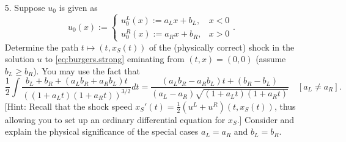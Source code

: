 \documentclass{article}
\begin{document}
\begin{itemize}
\textbf{Solution}

Let $u$ denote the solution to \eqref{eq:burgers.strong} with initial condition $u_0$, and let $v$ denote the solution to \eqref{eq:burgers.strong} with initial condition $v_0(x) := a u_0(x) + b$. Using \eqref{eq:burgers.implicit}, we wish to solve
\begin{equation*}
v = v_0 \left( x - tv \right) = a u_0 \left( x - tv \right) \quad \Leftrightarrow \quad \frac{1}{a} \left( v - b \right) = u_0 \left( (x - tb) - (at) \frac{1}{a} \left( v - b \right) \right),
\end{equation*}
which suggests that
\begin{equation*}
\frac{1}{a} \left( v(t,x) - b \right) = u \left( at, x - tb \right) \quad \Leftrightarrow \quad v(t,x) = a u \left( at, x - tb \right) + b.
\end{equation*}
Indeed, one can quickly verify that this does, in fact, solve \eqref{eq:burgers.strong} with initial condition $v_0$. In other words,
\begin{equation*}
F \left[ x \mapsto a u_0(x) + b \right](t,x) = a F \left[ u_0 \right] \left( at, x - tb \right) + b.
\end{equation*}

\item[5.] Suppose $u_0$ is given as
\begin{equation*}
u_0(x) := \begin{cases} u^L_0(x) := a_L x + b_L, & x < 0 \\ u^R_0(x) := a_R x + b_R, & x > 0 \end{cases}.
\end{equation*}
Determine the path $t \mapsto \left( t, x_S(t) \right)$ of the (physically correct) shock in the solution $u$ to \eqref{eq:burgers.strong} eminating from $(t,x) = (0,0)$ (assume $b_L \geq b_R$). You may use the fact that
\begin{equation*}
\frac{1}{2} \int \frac{b_L + b_R + \left( a_L b_R + a_R b_L \right) t}{\left( \left( 1 + a_L t \right) \left( 1 + a_R t \right) \right)^{3/2}} dt = \frac{\left( a_L b_R - a_R b_L \right) t + \left( b_R - b_L \right)}{\left( a_L - a_R \right) \sqrt{\left( 1 + a_L t \right) \left( 1 + a_R t \right)}} \quad \left[ a_L \neq a_R \right].
\end{equation*}
[Hint: Recall that the shock speed $x_S'(t) = \frac{1}{2} \left( u^L + u^R \right) \left( t, x_S(t) \right)$, thus allowing you to set up an ordinary differential equation for $x_S$.] Consider and explain the physical significance of the special cases $a_L = a_R$ and $b_L = b_R$.


\end{itemize}
\end{document}

